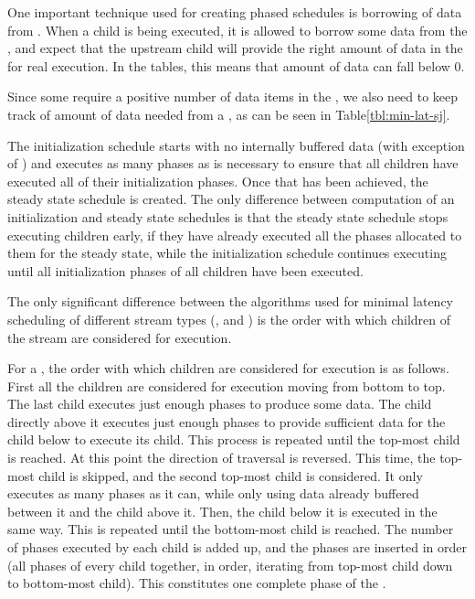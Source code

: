 One important technique used for creating phased schedules is
borrowing of data from {\Channels}.  When a child is being
executed, it is allowed to borrow some data from the {\Channel},
and expect that the upstream child will provide the right amount
of data in the {\Channel} for real execution. In the tables, this
means that amount of data can fall below 0.
\begin{comment}
This is obviously illegal during real execution for any
{\Channel}. Some {\Channels}, however, have even stricter
restrictions. If the node reading from a {\Channel} peeks more
than it pops, the amount of data in the {\Channel} during real
execution cannot fall below the $peek-pop$ amount.
\end{comment}
Since some {\filters} require a positive number of data items in
the {\Channel}, we also need to keep track of amount of data
needed from a {\Channel}, as can be seen in
Table\ref{tbl:min-lat-sj}.

The initialization schedule starts with no internally buffered
data (with exception of {{\feedbackloops}}) and executes as many
phases as is necessary to ensure that all children have executed
all of their initialization phases. Once that has been achieved,
the steady state schedule is created. The only difference between
computation of an initialization and steady state schedules is
that the steady state schedule stops executing children early, if
they have already executed all the phases allocated to them for
the steady state, while the initialization schedule continues
executing until all initialization phases of all children have
been executed.

The only significant difference between the algorithms used for
minimal latency scheduling of different stream types ({\pipeline},
{\splitjoin} and {{\feedbackloop}}) is the order with which children
of the stream are considered for execution.

\begin{comment}
For an $i$th child of a stream $s$ (stream $s_n$), the number of
phases that must be executed for its steady state schedule to be
complete is $S_{s,v,i} * |P_{s_i,T}|$.
\end{comment}

For a {\pipeline}, the order with which children are considered for
execution is as follows.  First all the children are considered
for execution moving from bottom to top.  The last child executes
just enough phases to produce some data.  The child directly above
it executes just enough phases to provide sufficient data for the
child below to execute its child.  This process is repeated until
the top-most child is reached.  At this point the direction of
traversal is reversed. This time, the top-most child is skipped,
and the second top-most child is considered.  It only executes as
many phases as it can, while only using data already buffered
between it and the child above it. Then, the child below it is
executed in the same way. This is repeated until the bottom-most
child is reached. The number of phases executed by each child is
added up, and the phases are inserted in order (all phases of
every child together, in order, iterating from top-most child down
to bottom-most child).  This constitutes one complete phase of the
{\pipeline}.

